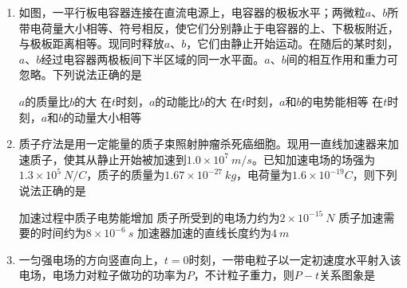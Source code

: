 \begin{enumerate}[leftmargin=0em]
\begin{minipage}[h!]{0.7\linewidth}
\vspace{0.3em}
\end{minipage}
\hfill
\begin{minipage}[h!]{0.3\linewidth}
\flushright
\vspace{0.3em}

\vspace{0.3em}
\end{minipage}



\item
{}
如图，一平行板电容器连接在直流电源上，电容器的极板水平；两微粒$ a $、$ b $所带电荷量大小相等、符号相反，使它们分别静止于电容器的上、下极板附近，与极板距离相等。现同时释放$ a $、$ b $，它们由静止开始运动。在随后的某时刻，$ a $、$ b $经过电容器两极板间下半区域的同一水平面。$ a $、$ b $间的相互作用和重力可忽略。下列说法正确的是  
\begin{figure}[h!]
\centering

\end{figure}

\fourchoices
{$ a $的质量比$ b $的大}
{在$ t $时刻，$ a $的动能比$ b $的大}
{在$ t $时刻，$ a $和$ b $的电势能相等}
{在$ t $时刻，$ a $和$ b $的动量大小相等}


\item
{}
质子疗法是用一定能量的质子束照射肿瘤杀死癌细胞。现用一直线加速器来加速质子，使其从静止开始被加速到$ 1.0 \times 10^7 \ m/s $。已知加速电场的场强为$ 1.3 \times 10^5 \ N/C $，质子的质量为$ 1.67 \times 10^{-27} \ kg $，电荷量为$ 1.6 \times 10^{-19}C $，则下列说法正确的是  



\fourchoices
{加速过程中质子电势能增加}
{质子所受到的电场力约为$ 2 \times 10^{-15} \ N $}
{质子加速需要的时间约为$ 8 \times 10^{-6} \ s $}
{加速器加速的直线长度约为$ 4 \ m $}





\item
{}
一匀强电场的方向竖直向上，$ t=0 $时刻，一带电粒子以一定初速度水平射入该电场，电场力对粒子做功的功率为$ P $，不计粒子重力，则$ P-t $关系图象是  
\begin{figure}[h!]
\centering

\end{figure}





\end{enumerate}
